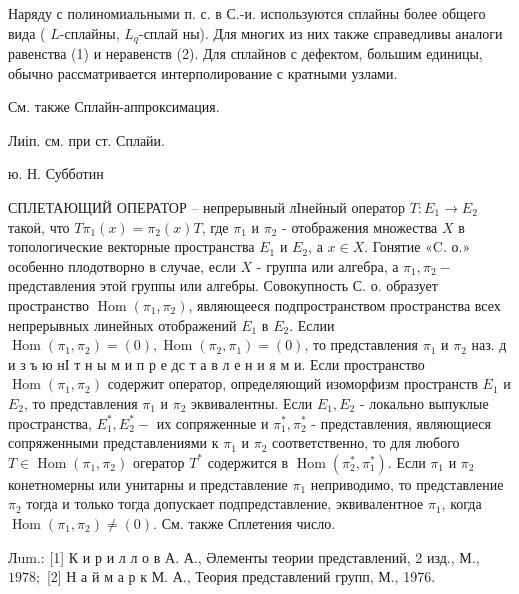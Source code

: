 \documentclass[10pt]{article}
\begin{document}
Наряду с полиномиальными п. с. в С.-и. используются сплайны более общего вида ( $L$-сплайны, $L_{q}$-сплай ны). Для многих из них также справедливы аналоги равенства (1) и неравенств (2). Для сплайнов с дефектом, большим единицы, обычно рассматривается интерполирование с кратными узлами.



См. также Сплайн-аппроксимация.



Лиіп. см. при ст. Сплайи.



ю. Н. Субботин



СПЛЕТАЮЩИЙ ОПЕРАТОР -- непрерывный лІнейный оператор $T: E_{1} \rightarrow E_{2}$ такоӥ, что $T \pi_{1}(x)=\pi_{2}(x) T$, где $\pi_{1}$ и $\pi_{2}$ - отображения множества $X$ в топологические векторные пространства $E_{1}$ и $E_{2}$, а $x \in X$. Гонятие «C. о.» особенно плодотворно в случае, если $X$ - группа или алгебра, а $\pi_{1}, \pi_{2}-$ представления этой группы или алгебры. Совокупность С. о. образует пространство $\operatorname{Hom}\left(\pi_{1}, \pi_{2}\right)$, являющееся подпространством пространства всех непрерывных линейных отображений $E_{1}$ в $E_{2}$. Еслии $\operatorname{Hom}\left(\pi_{1}, \pi_{2}\right)=(0), \operatorname{Hom}\left(\pi_{2}, \pi_{1}\right)=(0)$, то представления $\pi_{1}$ и $\pi_{2}$ наз. д и з ъ ю нІ т н ы м и п р е дс т а в л е н и я м и. Если пространство $\operatorname{Hom}\left(\pi_{1}, \pi_{2}\right)$ содержит оператор, определяющий изоморфизм пространств $E_{1}$ и $E_{2}$, то представления $\pi_{1}$ и $\pi_{2}$ эквивалентны. Если $E_{1}, E_{2}$ - локально выпуклые пространства, $E_{1}^{*}, E_{2}^{*}-$ их сопряженные и $\pi_{1}^{*}, \pi_{2}^{*}$ - представления, являющиеся сопряженными представлениями к $\pi_{1}$ и $\pi_{2}$ соответственно, то для любого $T \in \operatorname{Hom}\left(\pi_{1}, \pi_{2}\right)$ огератор $T^{*}$ содержится в $\operatorname{Hom}\left(\pi_{2}^{*}, \pi_{1}^{*}\right)$. Если $\pi_{1}$ и $\pi_{2}$ конетномерны или унитарны и представление $\pi_{1}$ неприводимо, то представление $\pi_{2}$ тогда и только тогда допускает подпредставление, эквивалентное $\pi_{1}$, когда $\operatorname{Hom}\left(\pi_{1}, \pi_{2}\right) \neq(0)$. См. также Сплетения число.



Лum.: [1] К и р и л л о в А. А., Әлементы теории представлений, 2 изд., М., $1978 ;$ [2] Н а й м а р к М. А., Теория представлений групп, М., 1976.
\end{document}
